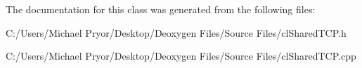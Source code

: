 The documentation for this class was generated from the following files:\begin{DoxyCompactItemize}
\item 
C:/Users/Michael Pryor/Desktop/Deoxygen Files/Source Files/clSharedTCP.h\item 
C:/Users/Michael Pryor/Desktop/Deoxygen Files/Source Files/clSharedTCP.cpp\end{DoxyCompactItemize}

